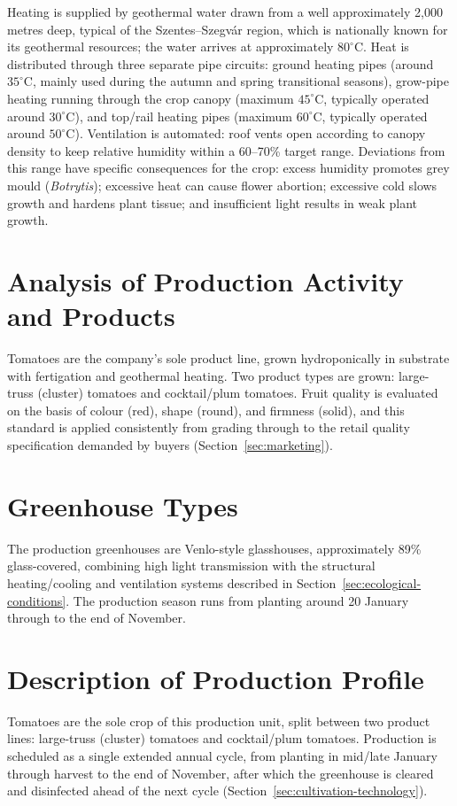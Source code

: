 Heating is supplied by geothermal water drawn from a well approximately 2{,}000 metres deep, typical of the Szentes--Szegvár region, which is nationally known for its geothermal resources; the water arrives at approximately $80^{\circ}\mathrm{C}$. Heat is distributed through three separate pipe circuits: ground heating pipes (around $35^{\circ}\mathrm{C}$, mainly used during the autumn and spring transitional seasons), grow-pipe heating running through the crop canopy (maximum $45^{\circ}\mathrm{C}$, typically operated around $30^{\circ}\mathrm{C}$), and top/rail heating pipes (maximum $60^{\circ}\mathrm{C}$, typically operated around $50^{\circ}\mathrm{C}$). Ventilation is automated: roof vents open according to canopy density to keep relative humidity within a 60--70\% target range. Deviations from this range have specific consequences for the crop: excess humidity promotes grey mould (\emph{Botrytis}); excessive heat can cause flower abortion; excessive cold slows growth and hardens plant tissue; and insufficient light results in weak plant growth.

\section{Analysis of Production Activity and Products}
Tomatoes are the company's sole product line, grown hydroponically in substrate with fertigation and geothermal heating. Two product types are grown: large-truss (cluster) tomatoes and cocktail/plum tomatoes. Fruit quality is evaluated on the basis of colour (red), shape (round), and firmness (solid), and this standard is applied consistently from grading through to the retail quality specification demanded by buyers (Section~\ref{sec:marketing}).

\section{Greenhouse Types}
The production greenhouses are Venlo-style glasshouses, approximately 89\% glass-covered, combining high light transmission with the structural heating/cooling and ventilation systems described in Section~\ref{sec:ecological-conditions}. The production season runs from planting around 20 January through to the end of November.

\section{Description of Production Profile}
Tomatoes are the sole crop of this production unit, split between two product lines: large-truss (cluster) tomatoes and cocktail/plum tomatoes. Production is scheduled as a single extended annual cycle, from planting in mid/late January through harvest to the end of November, after which the greenhouse is cleared and disinfected ahead of the next cycle (Section~\ref{sec:cultivation-technology}).

